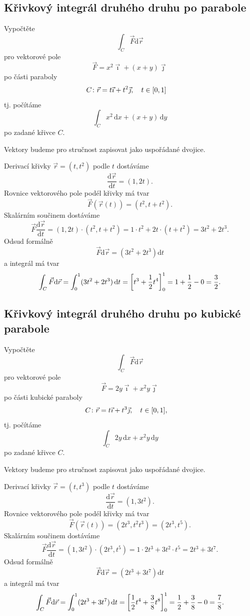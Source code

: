 \konec


\subsection{Křivkový integrál druhého druhu po parabole}


Vypočtěte $$\int_{C} \vec F \mathrm d\vec r$$ pro vektorové pole $$\vec F=x^2\vec \imath + (x+y)\vec\jmath$$ po části paraboly
\begin{align*}
  C&\colon \vec r=t\vec \imath + t^2\vec\jmath, \quad t\in\qty[0,1]
\end{align*}
tj. počítáme
$$\int_C x^2\,\mathrm dx + (x+y)\,\mathrm dy$$
po zadané křivce $C$.

\reseni

Vektory budeme pro stručnost zapisovat jako uspořádané dvojice.

\stranka

Derivací křivky $\vec r=(t,t^2)$ podle $t$ dostáváme
$$\frac{\mathrm d\vec r}{\mathrm dt}=(1,2t).$$
Rovnice vektorového pole podél křivky má tvar
$$\vec F(\vec r(t))=(t^2,t+t^2).$$
Skalárním součinem dostáváme
$$\vec F \frac{\mathrm d\vec r}{\mathrm dt}=
(1,2t)\cdot (t^2,t+t^2) = 1\cdot t^2+2t\cdot(t+t^2)=3t^2+2t^3.
$$
Odsud formálně $$\vec F\mathrm d\vec r=(3t^2+2t^3)\mathrm dt$$
a integrál má tvar
$$\int_C\vec F\mathrm d\vec r=\int_0^{1}(3t^2+2t^3)\,\mathrm dt
=\qty[t^3+\frac 12 t^4]_0^1=1+\frac 12 - 0 = \frac 32.$$

\konec

\stranka


\subsection{Křivkový integrál druhého druhu po kubické parabole}


Vypočtěte $$\int_{C} \vec F \mathrm d\vec r$$ pro vektorové pole $$\vec F=2y\vec \imath + x^2y\vec\jmath$$ po části kubické paraboly
\begin{align*}
  C&\colon \vec r=t\vec \imath + t^3\vec\jmath, \quad t\in\qty[0,1],
\end{align*}
tj. počítáme
$$\int_C 2y\,\mathrm dx + x^2y\,\mathrm dy$$
po zadané křivce $C$.

\reseni

Vektory budeme pro stručnost zapisovat jako uspořádané dvojice.

\stranka

Derivací křivky $\vec r=(t,t^3)$ podle $t$ dostáváme
$$\frac{\mathrm d\vec r}{\mathrm dt}=(1,3t^2).$$
Rovnice vektorového pole podél křivky má tvar
$$\vec F(\vec r(t))=(2t^3,t^2t^3)=(2t^3,t^5).$$
Skalárním součinem dostáváme
$$\vec F \frac{\mathrm d\vec r}{\mathrm dt}=
(1,3t^2)\cdot (2t^3,t^5) = 1\cdot 2t^3+3t^2\cdot t^5=2t^3+3t^7.
$$
Odsud formálně $$\vec F\mathrm d\vec r=(2t^3+3t^7)\mathrm dt$$
a integrál má tvar
$$\int_C\vec F\mathrm d\vec r=\int_0^{1}(2t^3+3t^7)\,\mathrm dt
=\qty[\frac 12 t^4 + \frac 38 t^8]_0^1=\frac 12 +\frac 38 - 0 = \frac 78.$$

